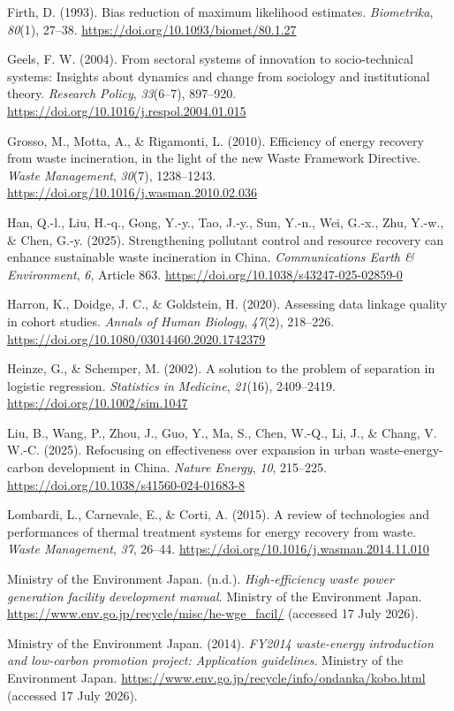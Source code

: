 \documentclass[12pt,letterpaper]{article}
\begin{document}
Firth, D. (1993). Bias reduction of maximum likelihood estimates.
\textit{Biometrika}, \textit{80}(1), 27--38.
\url{https://doi.org/10.1093/biomet/80.1.27}

Geels, F. W. (2004). From sectoral systems of innovation to socio-technical
systems: Insights about dynamics and change from sociology and institutional
theory. \textit{Research Policy}, \textit{33}(6--7), 897--920.
\url{https://doi.org/10.1016/j.respol.2004.01.015}

Grosso, M., Motta, A., \& Rigamonti, L. (2010). Efficiency of energy recovery
from waste incineration, in the light of the new Waste Framework Directive.
\textit{Waste Management}, \textit{30}(7), 1238--1243.
\url{https://doi.org/10.1016/j.wasman.2010.02.036}

Han, Q.-l., Liu, H.-q., Gong, Y.-y., Tao, J.-y., Sun, Y.-n., Wei, G.-x., Zhu,
Y.-w., \& Chen, G.-y. (2025). Strengthening pollutant control and resource
recovery can enhance sustainable waste incineration in China.
\textit{Communications Earth \& Environment}, \textit{6}, Article 863.
\url{https://doi.org/10.1038/s43247-025-02859-0}

Harron, K., Doidge, J. C., \& Goldstein, H. (2020). Assessing data linkage
quality in cohort studies. \textit{Annals of Human Biology}, \textit{47}(2),
218--226. \url{https://doi.org/10.1080/03014460.2020.1742379}

Heinze, G., \& Schemper, M. (2002). A solution to the problem of separation in
logistic regression. \textit{Statistics in Medicine}, \textit{21}(16),
2409--2419. \url{https://doi.org/10.1002/sim.1047}

Liu, B., Wang, P., Zhou, J., Guo, Y., Ma, S., Chen, W.-Q., Li, J., \& Chang,
V. W.-C. (2025). Refocusing on effectiveness over expansion in urban
waste-energy-carbon development in China. \textit{Nature Energy}, \textit{10},
215--225. \url{https://doi.org/10.1038/s41560-024-01683-8}

Lombardi, L., Carnevale, E., \& Corti, A. (2015). A review of technologies and
performances of thermal treatment systems for energy recovery from waste.
\textit{Waste Management}, \textit{37}, 26--44.
\url{https://doi.org/10.1016/j.wasman.2014.11.010}

Ministry of the Environment Japan. (n.d.). \textit{High-efficiency waste power
generation facility development manual}. Ministry of the Environment Japan.
\url{https://www.env.go.jp/recycle/misc/he-wge_facil/} (accessed 17 July 2026).

Ministry of the Environment Japan. (2014). \textit{FY2014 waste-energy
introduction and low-carbon promotion project: Application guidelines}.
Ministry of the Environment Japan.
\url{https://www.env.go.jp/recycle/info/ondanka/kobo.html} (accessed 17 July
2026).
\end{document}
